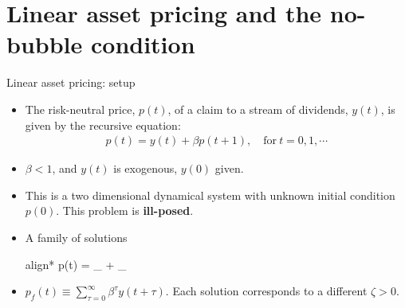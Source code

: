 \documentclass[aspectratio=169,10pt]{beamer}
\newcommand{\emphcolor}[1]{\textbf{\textcolor{emphcolorval}{#1}}}
\begin{document}
\section{\textcolor{PennBlue}{Linear asset pricing and the no-bubble condition}}

\begin{frame}{Linear asset pricing: setup }
	\begin{itemize}
	\item The risk-neutral price, $p(t)$, of a claim to a stream of dividends, $y(t)$, is given by
	the recursive equation:
	\begin{align*}
		p(t) = y(t) + \beta p(t+1), \quad \text{for}~ t=0,1,\cdots
	\end{align*}
	\item $\beta<1$, and $y(t)$ is exogenous, $y(0)$ given.
	\item  This is a two dimensional dynamical system with unknown initial condition  $p(0)$. This problem is \emphcolor{ill-posed}.
	\item A family of solutions
	 \begin{empheq}[box=\tcbhighmath]{align*}
	 	p(t) = _{} +  _{}
	 \end{empheq}
	 \item $p_f(t) \equiv \sum_{\tau =0}^\infty \beta^\tau y(t+\tau)$. Each solution corresponds to a different $\zeta>0$.
	\end{itemize}
\end{frame}
\end{document}
